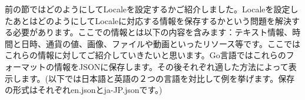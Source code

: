 前の節ではどのようにしてLocaleを設定するかご紹介しました。Localeを設定したあとはどのようにしてLocaleに対応する情報を保存するかという問題を解決する必要があります。ここでの情報とは以下の内容を含みます：テキスト情報、時間と日時、通貨の値、画像、ファイルや動画といったリソース等です。ここではこれらの情報に対してご紹介していきたいと思います。Go言語ではこれらのフォーマットの情報をJSONに保存します。その後それぞれ適した方法によって表示します。(以下では日本語と英語の２つの言語を対比して例を挙げます。保存の形式はそれぞれen.jsonとja-JP.jsonです。)

